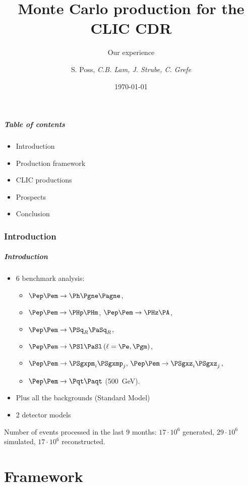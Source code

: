 \documentclass{beamer}
\author{S. Poss, \emph{C.B. Lam, J. Strube, C. Grefe}}
\institute[CERN]{CERN}
\title[]{Monte Carlo production for the CLIC CDR}
\subtitle{Our experience}
\date{\today}
\begin{document}
\begin{frame}
	\titlepage
\end{frame}

\begin{frame}
	\frametitle{Table of contents}
	\begin{itemize}
\item Introduction
\item Production framework
\item CLIC productions
\item Prospects
\item Conclusion
\end{itemize}
\end{frame}

\section{Introduction}

\begin{frame}
	\frametitle{Introduction}
\begin{itemize}
\item 6 benchmark analysis: 
\begin{itemize}
\item $\Pep\Pem \to \Ph \Pgne \Pagne$,
\item  $\Pep\Pem \to \PHp \PHm$, $\Pep\Pem \to \PHz \PA$, 
\item $\Pep\Pem \to \PSq_R \PaSq_R$, 
\item $\Pep\Pem \to \PSl \PaSl \,(\ell = \Pe,\Pgm)$, 
\item $\Pep\Pem \to \PSgxpm_i \PSgxmp_j,\, \Pep\Pem \to \PSgxz_i \PSgxz_j$,
\item  $\Pep\Pem \to \Pqt \Paqt$ (500~GeV).
\end{itemize}
\item Plus all the backgrounds (Standard Model)
\item 2 detector models
\end{itemize}
Number of events processed in the last 9 months: $17\cdot 10^6$ generated, $29\cdot 10^6$ simulated, $17\cdot 10^6$ reconstructed.
\end{frame}

\part{Framework}
\begin{frame}
\partpage 
\end{frame}
\end{document}

